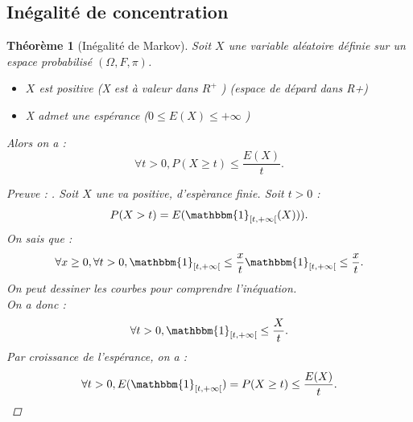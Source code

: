 \documentclass{article}
\theoremstyle{plain}%
\newtheorem{thm}{Théorème}[section]
\theoremstyle{definition}
\theoremstyle{remark}
\begin{document}
\subsection{Inégalité de concentration}
\begin{thm}[Inégalité de Markov]
    Soit $ X $ une variable aléatoire définie sur un espace probabilisé $ (\Omega , F, \pi ) $. \begin{itemize}
        \item $ X $ est positive (X est à valeur dans $ R^+ $ ) (espace de dépard dans R+)
        \item X admet une espérance ($ 0 \leq E(X) \leq + \infty  $ )
    \end{itemize}
    Alors on a : 
    \[
        \forall t > 0, P(X \geq t) \leq \frac{E(X)}{t}
    .\]
    
    \begin{proof}[Preuve : ]
        Soit $ X $ une va positive, d'espèrance finie. Soit $ t > 0 $ :
        \[
            P(X > t) = E(\mathbbm{1}_{[t, +\infty[}(X)))
        .\]
        On sais que : 
        \[
            \forall x \geq 0, \forall t > 0, \mathbbm{1}_{[t, +\infty[} \leq \frac{x}{t} \mathbbm{1}_{[t, +\infty[} \leq \frac{x}{t}
        .\]
        On peut dessiner les courbes pour comprendre l'inéquation.\\
        On a donc : 
        \[
            \forall t > 0, \mathbbm{1}_{[t, +\infty[} \leq \frac{X}{t}
        .\]
        Par croissance de l'espérance, on a : 
        \[
            \forall t > 0, E(\mathbbm{1}_{[t, +\infty[}) = P(X \geq t) \leq \frac{E(X)}{t}
        .\]
    \end{proof}
\end{thm}
\end{document}
